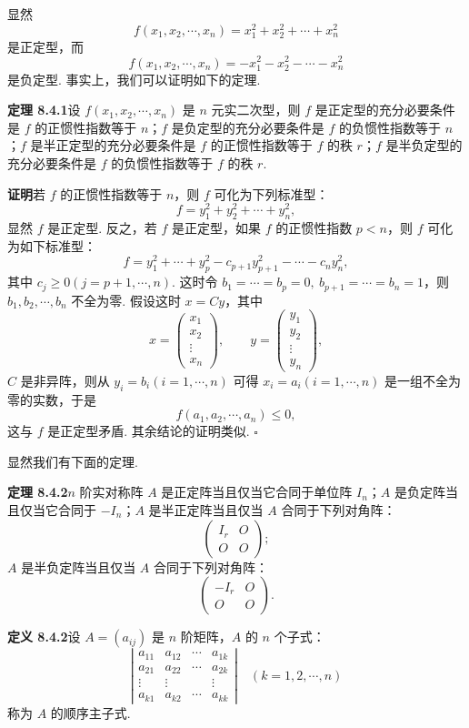 \documentclass[UTF8, 12pt, fontset=fandol, oneside]{ctexart}
\begin{document}
显然
\[
f(x_1,x_2,\cdots,x_n)=x_1^2+x_2^2+\cdots+x_n^2
\]
是正定型，而
\[
f(x_1,x_2,\cdots,x_n)=-x_1^2-x_2^2-\cdots-x_n^2
\]
是负定型. 事实上，我们可以证明如下的定理.

\noindent\textbf{定理 8.4.1}\quad 设 $f(x_1,x_2,\cdots,x_n)$ 是 $n$ 元实二次型，则 $f$ 是正定型的充分必要条件是 $f$ 的正惯性指数等于 $n$；$f$ 是负定型的充分必要条件是 $f$ 的负惯性指数等于 $n$；$f$ 是半正定型的充分必要条件是 $f$ 的正惯性指数等于 $f$ 的秩 $r$；$f$ 是半负定型的充分必要条件是 $f$ 的负惯性指数等于 $f$ 的秩 $r$.

\noindent\textbf{证明}\quad 若 $f$ 的正惯性指数等于 $n$，则 $f$ 可化为下列标准型：
\[
f=y_1^2+y_2^2+\cdots+y_n^2,
\]
显然 $f$ 是正定型. 反之，若 $f$ 是正定型，如果 $f$ 的正惯性指数 $p<n$，则 $f$ 可化为如下标准型：
\begin{equation}
f=y_1^2+\cdots+y_p^2-c_{p+1}y_{p+1}^2-\cdots-c_ny_n^2,
\tag{8.4.1}
\end{equation}
其中 $c_j\geq 0(j=p+1,\cdots,n)$. 这时令 $b_1=\cdots=b_p=0,\ b_{p+1}=\cdots=b_n=1$，则 $b_1,b_2,\cdots,b_n$ 不全为零. 假设这时 $x=Cy$，其中
\[
x=\left(\begin{array}{c}x_1\\x_2\\ \vdots\\x_n\end{array}\right),\qquad
y=\left(\begin{array}{c}y_1\\y_2\\ \vdots\\y_n\end{array}\right),
\]
$C$ 是非异阵，则从 $y_i=b_i(i=1,\cdots,n)$ 可得 $x_i=a_i(i=1,\cdots,n)$ 是一组不全为零的实数，于是
\[
f(a_1,a_2,\cdots,a_n)\leq 0,
\]
这与 $f$ 是正定型矛盾. 其余结论的证明类似. $\square$

显然我们有下面的定理.

\noindent\textbf{定理 8.4.2}\quad $n$ 阶实对称阵 $A$ 是正定阵当且仅当它合同于单位阵 $I_n$；$A$ 是负定阵当且仅当它合同于 $-I_n$；$A$ 是半正定阵当且仅当 $A$ 合同于下列对角阵：
\[
\left(\begin{array}{cc}I_r&O\\ O&O\end{array}\right);
\]
$A$ 是半负定阵当且仅当 $A$ 合同于下列对角阵：
\[
\left(\begin{array}{cc}-I_r&O\\ O&O\end{array}\right).
\]

\noindent\textbf{定义 8.4.2}\quad 设 $A=(a_{ij})$ 是 $n$ 阶矩阵，$A$ 的 $n$ 个子式：
\[
\left|\begin{array}{cccc}
a_{11}&a_{12}&\cdots&a_{1k}\\
a_{21}&a_{22}&\cdots&a_{2k}\\
\vdots&\vdots&&\vdots\\
a_{k1}&a_{k2}&\cdots&a_{kk}
\end{array}\right|\quad (k=1,2,\cdots,n)
\]
称为 $A$ 的顺序主子式.
\end{document}
